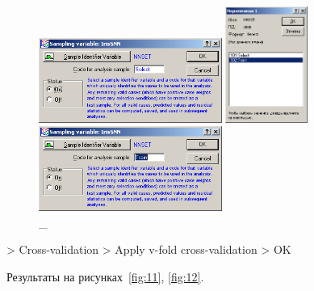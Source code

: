 \begin{figure}[!h]
  \centering

  \begin{minipage}{0.32\textwidth}
    \centering

    \includegraphics[width=6cm]
    {inc/ex_8.PNG}

    \caption{\_}

    \label{fig:8}
  \end{minipage}
  \begin{minipage}{0.32\textwidth}
    \centering

    \includegraphics[height=3.8cm]
    {inc/ex_9.PNG}

    \caption{\_}

    \label{fig:9}
  \end{minipage}
  \begin{minipage}{0.32\textwidth}
    \centering

    \includegraphics[width=6cm]
    {inc/ex_10.PNG}

    \caption{\_}

    \label{fig:10}
  \end{minipage}
\end{figure}

\newpage

> Cross-validation > Apply v-fold cross-validation > OK

Результаты на рисунках~\ref{fig:11}, \ref{fig:12}.

